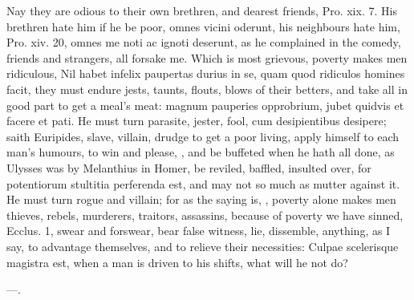 {{Nay they are odious to their own brethren, and dearest friends, Pro.
xix. 7. His brethren hate him if he be poor, omnes vicini
oderunt, his neighbours hate him, Pro. xiv. 20, omnes me noti ac
ignoti deserunt, as he complained in the comedy, friends and strangers,
all forsake me. Which is most grievous, poverty makes men ridiculous,
Nil habet infelix paupertas durius in se, quam quod ridiculos homines
facit, they must endure jests, taunts, flouts, blows of their
betters, and take all in good part to get a meal's meat: magnum
pauperies opprobrium, jubet quidvis et facere et pati. He must turn
parasite, jester, fool, cum desipientibus desipere; saith
Euripides, slave, villain, drudge to get a poor living, apply
himself to each man's humours, to win and please, \etc{}, and be buffeted
when he hath all done, as Ulysses was by Melanthius in Homer, be
reviled, baffled, insulted over, for potentiorum stultitia
perferenda est, and may not so much as mutter against it. He must turn
rogue and villain; for as the saying is, ,
poverty alone makes men thieves, rebels, murderers, traitors,
assassins, because of poverty we have sinned, Ecclus.  1, swear
and forswear, bear false witness, lie, dissemble, anything, as I say,
to advantage themselves, and to relieve their necessities: 
Culpae scelerisque magistra est, when a man is driven to his shifts,
what will he not do?

---.

}}
